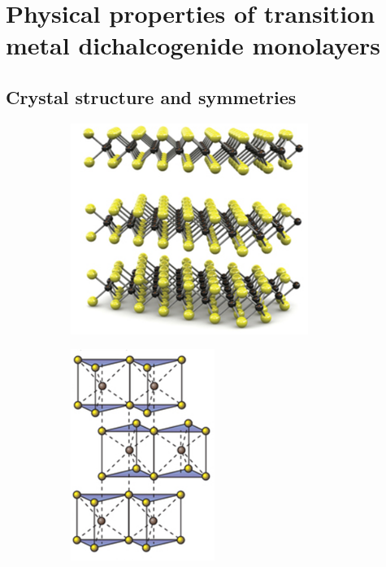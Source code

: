 \chapter{Physical properties of transition metal dichalcogenide monolayers}

\section{Crystal structure and symmetries}

\begin{figure}[t]
	\centering
	\begin{subfigure}{0.30\textwidth}
		\caption{}
		\includegraphics[height=.9\textwidth,left]{3d}
		\label{crystal1}
	\end{subfigure}
	\begin{subfigure}{0.30\textwidth}
		\caption{}
		\includegraphics[height=.9\textwidth,center]{triangles}

\end{subfigure}
\end{figure}
